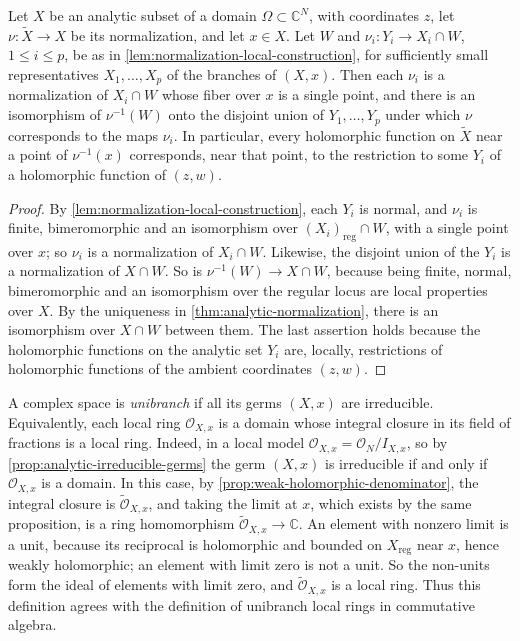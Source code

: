 \begin{corollary}\label{cor:normalization-local-graph}
Let $X$ be an analytic subset of a domain $\Omega\subset\mathbb C^N$, with coordinates $z$, let $\nu\colon\widetilde X\to X$ be its normalization, and let $x\in X$. Let $W$ and $\nu_i\colon Y_i\to X_i\cap W$, $1\leq i\leq p$, be as in \cref{lem:normalization-local-construction}, for sufficiently small representatives $X_1,\ldots,X_p$ of the branches of $(X,x)$. Then each $\nu_i$ is a normalization of $X_i\cap W$ whose fiber over $x$ is a single point, and there is an isomorphism of $\nu^{-1}(W)$ onto the disjoint union of $Y_1,\ldots,Y_p$ under which $\nu$ corresponds to the maps $\nu_i$. In particular, every holomorphic function on $\widetilde X$ near a point of $\nu^{-1}(x)$ corresponds, near that point, to the restriction to some $Y_i$ of a holomorphic function of $(z,w)$.
\end{corollary}
\begin{proof}
By \cref{lem:normalization-local-construction}, each $Y_i$ is normal, and $\nu_i$ is finite, bimeromorphic and an isomorphism over $(X_i)_{\mathrm{reg}}\cap W$, with a single point over $x$; so $\nu_i$ is a normalization of $X_i\cap W$. Likewise, the disjoint union of the $Y_i$ is a normalization of $X\cap W$. So is $\nu^{-1}(W)\to X\cap W$, because being finite, normal, bimeromorphic and an isomorphism over the regular locus are local properties over $X$. By the uniqueness in \cref{thm:analytic-normalization}, there is an isomorphism over $X\cap W$ between them. The last assertion holds because the holomorphic functions on the analytic set $Y_i$ are, locally, restrictions of holomorphic functions of the ambient coordinates $(z,w)$.
\end{proof}

\begin{definition}\label{def:analytic-unibranch}
A complex space is \emph{unibranch} if all its germs $(X,x)$ are irreducible. Equivalently, each local ring $\mathcal O_{X,x}$ is a domain whose integral closure in its field of fractions is a local ring. Indeed, in a local model $\mathcal O_{X,x}=\mathcal O_N/I_{X,x}$, so by \cref{prop:analytic-irreducible-germs} the germ $(X,x)$ is irreducible if and only if $\mathcal O_{X,x}$ is a domain. In this case, by \cref{prop:weak-holomorphic-denominator}, the integral closure is $\widetilde{\mathcal O}_{X,x}$, and taking the limit at $x$, which exists by the same proposition, is a ring homomorphism $\widetilde{\mathcal O}_{X,x}\to\mathbb C$. An element with nonzero limit is a unit, because its reciprocal is holomorphic and bounded on $X_{\mathrm{reg}}$ near $x$, hence weakly holomorphic; an element with limit zero is not a unit. So the non-units form the ideal of elements with limit zero, and $\widetilde{\mathcal O}_{X,x}$ is a local ring. Thus this definition agrees with the definition of unibranch local rings in commutative algebra.
\end{definition}


